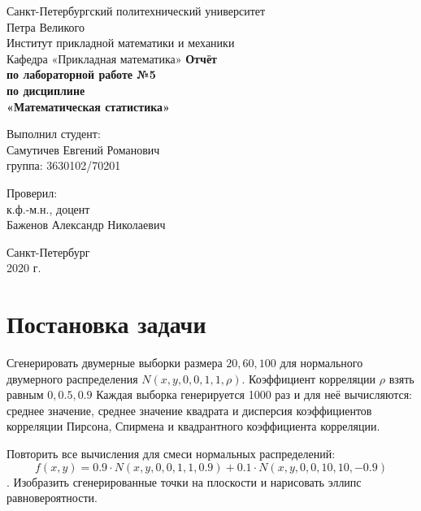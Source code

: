 \documentclass[12pt,a4paper]{article}
\begin{document}
	
\begin{titlepage}
	\begin{center}		
		\vfill	
		Санкт-Петербургский политехнический университет \\
		Петра Великого\\
		\vskip 1cm
		Институт прикладной математики и механики \\
		Кафедра «Прикладная математика»
		\vfill
		\textbf{Отчёт\\
			по лабораторной работе №5\\
			по дисциплине\\
			«Математическая статистика»\\}
		\vfill
	\end{center}
	\vfill
	\hfill
	\begin{minipage}{0.4\textwidth}
		Выполнил студент:\\
		Самутичев Евгений Романович\\
		группа: 3630102/70201\\
	\end{minipage}
	\vfill
	\hfill 
	\begin{minipage}{0.4\textwidth}
		Проверил:\\
		к.ф.-м.н., доцент\\
		Баженов Александр Николаевич\
	\end{minipage}
	\vfill
	\begin{center}
		Санкт-Петербург\\2020 г.
	\end{center}
\end{titlepage}

\tableofcontents
\listoffigures
\pagebreak

\section{Постановка задачи}
Сгенерировать двумерные выборки размера $20, 60, 100$ для нормального двумерного распределения $N(x, y, 0, 0, 1, 1, \rho)$.
Коэффициент корреляции $\rho$ взять равным $0, 0.5, 0.9$
Каждая выборка генерируется 1000 раз и для неё вычисляются: среднее значение, среднее значение квадрата и дисперсия коэффициентов
корреляции Пирсона, Спирмена и квадрантного коэффициента корреляции.

Повторить все вычисления для смеси нормальных распределений:
$$f(x,y) = 0.9\cdot N(x, y, 0, 0, 1, 1, 0.9) + 0.1\cdot N(x, y, 0, 0, 10, 10, -0.9)$$.
Изобразить сгенерированные точки на плоскости и нарисовать эллипс
равновероятности.
\pagebreak
\end{document}
